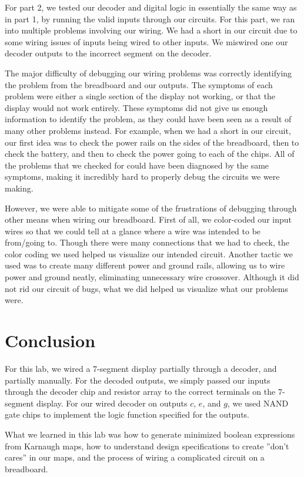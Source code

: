 \documentclass{article}
\begin{document}
For part 2, we tested our decoder and digital logic in essentially the
same way as in part 1, by running the valid inputs through our
circuits. For this part, we ran into multiple problems involving our
wiring. We had a short in our circuit due to some wiring issues of
inputs being wired to other inputs. We miswired one our decoder
outputs to the incorrect segment on the decoder.

The major difficulty of debugging our wiring problems was correctly
identifying the problem from the breadboard and our outputs. The
symptoms of each problem were either a single section of the display
not working, or that the display would not work entirely. These
symptoms did not give us enough information to identify the problem,
as they could have been seen as a result of many other problems
instead. For example, when we had a short in our circuit, our first
idea was to check the power rails on the sides of the breadboard, then
to check the battery, and then to check the power going to each of the
chips. All of the problems that we checked for could have been
diagnosed by the same symptoms, making it incredibly hard to properly
debug the circuits we were making.

However, we were able to mitigate some of the frustrations of
debugging through other means when wiring our breadboard. First of
all, we color-coded our input wires so that we could tell at a glance
where a wire was intended to be from/going to. Though there were many
connections that we had to check, the color coding we used helped us
visualize our intended circuit. Another tactic we used was to create
many different power and ground rails, allowing us to wire power and
ground neatly, eliminating unnecessary wire crossover. Although it did
not rid our circuit of bugs, what we did helped us visualize what our
problems were.


\section{Conclusion}

For this lab, we wired a 7-segment display partially through a
decoder, and partially manually. For the decoded outputs, we simply
passed our inputs through the decoder chip and resistor array to the
correct terminals on the 7-segment display. For our wired decoder on
outputs $c$, $e$, and $g$, we used NAND gate chips to implement the
logic function specified for the outputs.

What we learned in this lab was how to generate minimized boolean
expressions from Karnaugh maps, how to understand design
specifications to create ''don't cares'' in our maps, and the process
of wiring a complicated circuit on a breadboard.
\end{document}
